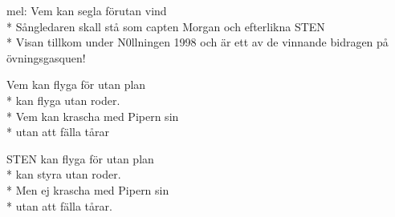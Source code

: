 \begin{SongText}[Sten]
    \begin{SongInfo}
        mel: Vem kan segla förutan vind\\*%
        Sångledaren skall stå som capten Morgan och efterlikna STEN\\*%
        Visan tillkom under N0llningen 1998 och är ett av de vinnande bidragen på övningsgasquen!
    \end{SongInfo}
    \begin{Verse}
        Vem kan flyga för utan plan\\*%
        kan flyga utan roder.\\*%
        Vem kan krascha med Pipern sin\\*%
        utan att fälla tårar
    \end{Verse}
    \begin{Verse}
        STEN kan flyga för utan plan\\*%
        kan styra utan roder.\\*%
        Men ej krascha med Pipern sin\\*%
        utan att fälla tårar.
    \end{Verse}
\end{SongText}

